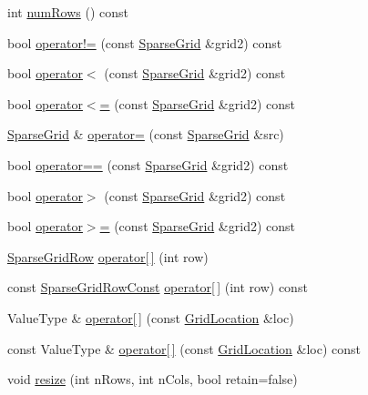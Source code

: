 \begin{DoxyCompactItemize}
int \mbox{\hyperlink{classSparseGrid_a00b7e69dd5c43e42cc91db26c459ad8b}{num\+Rows}} () const
\item 
bool \mbox{\hyperlink{classSparseGrid_add4cf9beceb23cac0a92b6b7472a15fc}{operator!=}} (const \mbox{\hyperlink{classSparseGrid}{Sparse\+Grid}} \&grid2) const
\item 
bool \mbox{\hyperlink{classSparseGrid_aa29d0f6b97d0a47d96dd68c3516745cb}{operator$<$}} (const \mbox{\hyperlink{classSparseGrid}{Sparse\+Grid}} \&grid2) const
\item 
bool \mbox{\hyperlink{classSparseGrid_a59e4b0776c64418243126d54c6375a3e}{operator$<$=}} (const \mbox{\hyperlink{classSparseGrid}{Sparse\+Grid}} \&grid2) const
\item 
\mbox{\hyperlink{classSparseGrid}{Sparse\+Grid}} \& \mbox{\hyperlink{classSparseGrid_ae543f0ee9281f0d43b3feaf884e0d8f5}{operator=}} (const \mbox{\hyperlink{classSparseGrid}{Sparse\+Grid}} \&src)
\item 
bool \mbox{\hyperlink{classSparseGrid_adca16e99b3494de035a2e6e61ebb27a5}{operator==}} (const \mbox{\hyperlink{classSparseGrid}{Sparse\+Grid}} \&grid2) const
\item 
bool \mbox{\hyperlink{classSparseGrid_a2ab4ffeb5dd21aea609c82c1dcc0fd8e}{operator$>$}} (const \mbox{\hyperlink{classSparseGrid}{Sparse\+Grid}} \&grid2) const
\item 
bool \mbox{\hyperlink{classSparseGrid_a05fabc042df451915478a358ebf9d1e1}{operator$>$=}} (const \mbox{\hyperlink{classSparseGrid}{Sparse\+Grid}} \&grid2) const
\item 
\mbox{\hyperlink{classSparseGrid_1_1SparseGridRow}{Sparse\+Grid\+Row}} \mbox{\hyperlink{classSparseGrid_aa9fc713bc20f40c89e4b3a86a4583fb9}{operator\mbox{[}$\,$\mbox{]}}} (int row)
\item 
const \mbox{\hyperlink{classSparseGrid_1_1SparseGridRowConst}{Sparse\+Grid\+Row\+Const}} \mbox{\hyperlink{classSparseGrid_a269741238689cf035ad12e8cff38844f}{operator\mbox{[}$\,$\mbox{]}}} (int row) const
\item 
Value\+Type \& \mbox{\hyperlink{classSparseGrid_afcc1243cd81603e13b8f223f0ceabe96}{operator\mbox{[}$\,$\mbox{]}}} (const \mbox{\hyperlink{structGridLocation}{Grid\+Location}} \&loc)
\item 
const Value\+Type \& \mbox{\hyperlink{classSparseGrid_a914315640e381831ab30403063205359}{operator\mbox{[}$\,$\mbox{]}}} (const \mbox{\hyperlink{structGridLocation}{Grid\+Location}} \&loc) const
\item 
void \mbox{\hyperlink{classSparseGrid_ace38e4e9ed81ae4ec651e4db9ab09db0}{resize}} (int n\+Rows, int n\+Cols, bool retain=false)

\end{DoxyCompactItemize}
